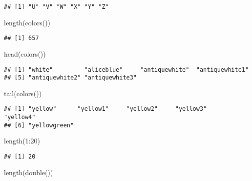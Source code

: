 \documentclass[
]{article}
\newenvironment{Shaded}{\begin{snugshade}}{\end{snugshade}}
\newcommand{\DecValTok}[1]{\textcolor[rgb]{0.00,0.00,0.81}{#1}}
\newcommand{\FunctionTok}[1]{\textcolor[rgb]{0.00,0.00,0.00}{#1}}
\newcommand{\NormalTok}[1]{#1}
\newcommand{\SpecialCharTok}[1]{\textcolor[rgb]{0.00,0.00,0.00}{#1}}
\begin{document}
\begin{verbatim}
## [1] "U" "V" "W" "X" "Y" "Z"
\end{verbatim}

\begin{Shaded}
\begin{Highlighting}[]
\FunctionTok{length}\NormalTok{(}\FunctionTok{colors}\NormalTok{())}
\end{Highlighting}
\end{Shaded}

\begin{verbatim}
## [1] 657
\end{verbatim}

\begin{Shaded}
\begin{Highlighting}[]
\FunctionTok{head}\NormalTok{(}\FunctionTok{colors}\NormalTok{())}
\end{Highlighting}
\end{Shaded}

\begin{verbatim}
## [1] "white"         "aliceblue"     "antiquewhite"  "antiquewhite1"
## [5] "antiquewhite2" "antiquewhite3"
\end{verbatim}

\begin{Shaded}
\begin{Highlighting}[]
\FunctionTok{tail}\NormalTok{(}\FunctionTok{colors}\NormalTok{())}
\end{Highlighting}
\end{Shaded}

\begin{verbatim}
## [1] "yellow"      "yellow1"     "yellow2"     "yellow3"     "yellow4"    
## [6] "yellowgreen"
\end{verbatim}

\begin{Shaded}
\begin{Highlighting}[]
\FunctionTok{length}\NormalTok{(}\DecValTok{1}\SpecialCharTok{:}\DecValTok{20}\NormalTok{)}
\end{Highlighting}
\end{Shaded}

\begin{verbatim}
## [1] 20
\end{verbatim}

\begin{Shaded}
\begin{Highlighting}[]
\FunctionTok{length}\NormalTok{(}\FunctionTok{double}\NormalTok{())}
\end{Highlighting}
\end{Shaded}
\end{document}
